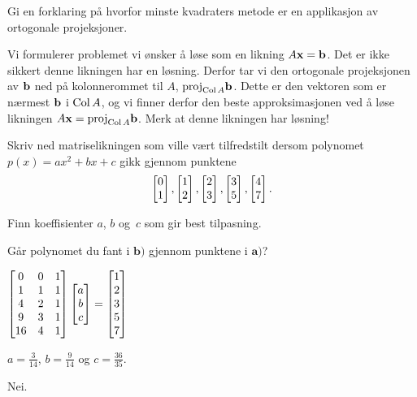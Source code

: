 \begin{oppgave}
Gi en forklaring på hvorfor minste kvadraters metode er en applikasjon av ortogonale projeksjoner.
\end{oppgave}

\begin{losning}
Vi formulerer problemet vi ønsker å løse som en likning $A\mathbf{x}=\mathbf{b}$. Det er ikke sikkert denne likningen har en løsning. Derfor tar vi den ortogonale projeksjonen av $\mathbf{b}$ ned på kolonnerommet til $A$, $\text{proj}_{\operatorname{Col} A}\mathbf{b}$. Dette er den vektoren som er nærmest $\mathbf{b}$ i $\operatorname{Col} A$, og vi finner derfor den beste approksimasjonen ved å løse likningen $A\mathbf{x}=\text{proj}_{\operatorname{Col} A}\mathbf{b}$. Merk at denne likningen har løsning!
\end{losning}

\begin{oppgave}
\begin{punkt}
Skriv ned matriselikningen som ville vært tilfredstilt dersom polynomet $p(x)=ax^2+bx+c$ gikk gjennom punktene
$$\begin{bmatrix} 0 \\ 1 \end{bmatrix}, \begin{bmatrix} 1 \\ 2 \end{bmatrix}, \begin{bmatrix} 2 \\ 3 \end{bmatrix},\begin{bmatrix} 3 \\ 5 \end{bmatrix},\begin{bmatrix} 4 \\ 7 \end{bmatrix}.$$
\end{punkt}
\begin{punkt}
Finn koeffisienter $a$, $b$ og~$c$ som gir best tilpasning.
\end{punkt}

\begin{punkt}
Går polynomet du fant i $\textbf{b)}$ gjennom punktene i $\textbf{a)}$?
\end{punkt}

\end{oppgave}

\begin{losning}
\begin{punkt}
$
\begin{bmatrix}
0 & 0 & 1\\
1 & 1 & 1\\
4 & 2 & 1\\
9 & 3 & 1\\
16 & 4 & 1
\end{bmatrix}\begin{bmatrix} a \\ b \\ c \end{bmatrix}=\begin{bmatrix}
1\\
2\\
3\\
5\\
7
\end{bmatrix}$
\end{punkt}

\begin{punkt}
$a=\frac{3}{14}$, $b=\frac{9}{14}$ og $c=\frac{36}{35}$.
\end{punkt}

\begin{punkt}
Nei.
\end{punkt}

\end{losning}


